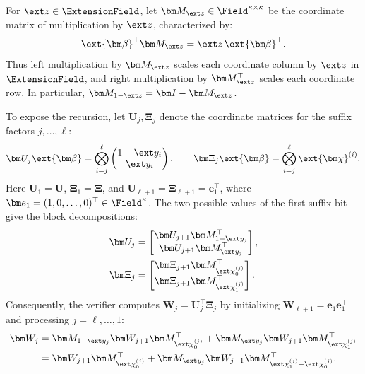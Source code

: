 For \(\ext z\in\ExtensionField\), let
\(\bm M_{\ext z}\in\Field^{\kappa\times\kappa}\) be the coordinate
matrix of multiplication by \(\ext z\), characterized by:
\begin{equation}
    \ext{\bm\beta}^{\top}\bm M_{\ext z}
    =\ext z\,\ext{\bm\beta}^{\top}.
\label{eq:pcs-multiplication-matrix}
\end{equation}
Thus left multiplication by \(\bm M_{\ext z}\) scales each
coordinate column by \(\ext z\) in \(\ExtensionField\), and right
multiplication by \(\bm M_{\ext z}^\top\) scales each coordinate row.
In particular, \(\bm M_{1-\ext z}=\bm I-\bm M_{\ext z}\).

To expose the recursion, let \(\bm U_j,\bm\Xi_j\) denote the
coordinate matrices for the suffix factors \(j,\ldots,\ell\):
\[
    \bm U_j\ext{\bm\beta}
    =\bigotimes_{i=j}^{\ell}
        \begin{pmatrix}1-\ext y_i\\ \ext y_i\end{pmatrix},
    \qquad
    \bm\Xi_j\ext{\bm\beta}
    =\bigotimes_{i=j}^{\ell}\ext{\bm\chi}^{(i)}.
\]
Here \(\bm U_1=\bm U\), \(\bm\Xi_1=\bm\Xi\), and
\(\bm U_{\ell+1}=\bm\Xi_{\ell+1}=\bm e_1^\top\), where
\(\bm e_1=(1,0,\ldots,0)^\top\in\Field^\kappa\).
The two possible values of the first suffix bit give the block
decompositions:
\begin{equation}
\begin{aligned}
    \bm U_j
    &=
    \begin{bmatrix}
        \bm U_{j+1}\bm M_{1-\ext y_j}^\top\\
        \bm U_{j+1}\bm M_{\ext y_j}^\top
    \end{bmatrix},\\
    \bm\Xi_j
    &=
    \begin{bmatrix}
        \bm\Xi_{j+1}\bm M_{\ext\chi^{(j)}_0}^\top\\
        \bm\Xi_{j+1}\bm M_{\ext\chi^{(j)}_1}^\top
    \end{bmatrix}.
\end{aligned}
\label{eq:pcs-query-blocks}
\end{equation}
Consequently, the verifier computes
\(\bm W_j=\bm U_j^\top\bm\Xi_j\) by initializing
\(\bm W_{\ell+1}=\bm e_1\bm e_1^\top\) and processing
\(j=\ell,\ldots,1\):
\begin{equation}
\begin{aligned}
    \bm W_j
    &=
    \bm M_{1-\ext y_j}\bm W_{j+1}
        \bm M_{\ext\chi^{(j)}_0}^\top
    +\bm M_{\ext y_j}\bm W_{j+1}
        \bm M_{\ext\chi^{(j)}_1}^\top\\
    &=
    \bm W_{j+1}\bm M_{\ext\chi^{(j)}_0}^\top
    +\bm M_{\ext y_j}\bm W_{j+1}
        \bm M_{\ext\chi^{(j)}_1-\ext\chi^{(j)}_0}^\top.
\end{aligned}
\label{eq:pcs-query-recurrence}
\end{equation}
